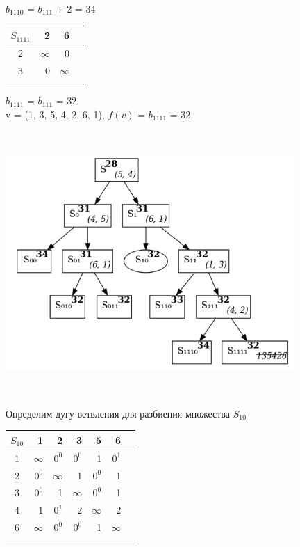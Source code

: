 \documentclass[12pt]{article}
\begin{document}
$b_{1110}$ = $b_{111}$ + 2 = 34\\

\begin{flushleft}
\begin{tabular}{c||rr||c}
 $S_{1111}$ & 2   & 6 & \\
\hline
\hline
2 &  $\infty$ & 0 & \\
3 &  0   &  $\infty$ & \\
\hline
\hline
 & &  & \\
\end{tabular}
\end{flushleft}

$b_{1111}$ = $b_{111}$ = 32\\

v = (1, 3, 5, 4, 2, 6, 1), $f(v)$ = $b_{1111}$  = 32\\
\begin{flushleft}
 
\includegraphics[width = 11cm, height = 10cm]{pictures/picture_09.jpg}\\
\end{flushleft}
\vspace{3cm}
\begin{flushleft}
 
Определим дугу ветвления для разбиения множества $S_{10}$\\
\end{flushleft}

\begin{flushleft}
\begin{tabular}{c||rrrrr||c}
$S_{10}$ & 1 & 2 & 3 & 5 & 6 & \\
\hline
\hline
1 & $\infty$ & $0^0$ & $0^0$  & 1 & $0^1$ & \\
2 & $0^0$ & $\infty$ & 1  & $0^0$ & 1 & \\
3 & $0^0$ & 1 & $\infty$  & $0^0$ & 1 & \\
4 & 1 & $0^1$ & 2  & $\infty$ & 2 & \\
6 & $\infty$ & $0^0$ & $0^0$  & 1 & $\infty$ & \\
\hline
\hline
 &  &  &  &  & \\
\end{tabular}
\end{flushleft}
\end{document}
